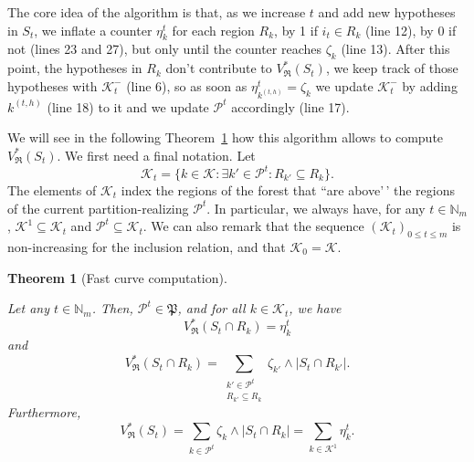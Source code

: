 \documentclass[
  11pt,
  a4paper,
]{article}
\theoremstyle{plain}
\theoremstyle{plain}
\theoremstyle{plain}
\newtheorem{theorem}{Theorem}[section]
\theoremstyle{definition}
\theoremstyle{definition}
\theoremstyle{remark}
\begin{document}
The core idea of the algorithm is that, as we increase \(t\) and add new
hypotheses in \(S_t\), we inflate a counter \(\eta_k^t\) for each region
\(R_k\), by 1 if \(i_t\in R_k\) (line 12), by 0 if not (lines 23 and
27), but only until the counter reaches \(\zeta_k\) (line 13). After
this point, the hypotheses in \(R_k\) don't contribute to
\(V^*_{\mathfrak{R}}(S_t)\), we keep track of those hypotheses with
\(\mathcal{K}^-_t\) (line 6), so as soon as
\(\eta^t_{k^{(t,h)}}=\zeta_k\) we update \(\mathcal{K}^-_t\) by adding
\(k^{(t,h)}\) (line 18) to it and we update \(\mathcal{P}^t\)
accordingly (line 17).

We will see in the following Theorem~\ref{thm-curve-path} how this
algorithm allows to compute \(V^*_{\mathfrak{R}}(S_t)\). We first need a
final notation. Let \begin{equation*}
\mathcal{K}_t=\{k\in\mathcal{K}: \exists k'\in \mathcal{P}^t : R_{k'}\subseteq R_k   \}.
\end{equation*} The elements of \(\mathcal{K}_t\) index the regions of
the forest that ``are above'\,' the regions of the current
partition-realizing \(\mathcal{P}^t\). In particular, we always have,
for any \(t\in\mathbb{N}_m\), \(\mathcal{K}^1\subseteq\mathcal{K}_t\)
and \(\mathcal{P}^t\subseteq \mathcal{K}_t\). We can also remark that
the sequence \((\mathcal{K}_t)_{0\leq t \leq m}\) is non-increasing for
the inclusion relation, and that \(\mathcal{K}_0=\mathcal{K}\).

\begin{theorem}[Fast curve
computation]\protect\hypertarget{thm-curve-path}{}\label{thm-curve-path}

Let any \(t\in\mathbb{N}_m\). Then, \(\mathcal{P}^t\in\mathfrak P\), and
for all \(k\in\mathcal{K}_t\), we have \begin{equation}
V^*_{\mathfrak{R}}(S_t\cap R_k) = \eta_k^t
\label{eq_vstar_inter_Rk_equal_eta}
\end{equation} and \begin{equation}
V^*_{\mathfrak{R}}(S_t\cap R_k) = \sum_{\substack{k'\in \mathcal{P}^t\\ R_{k'}\subseteq R_k}} \zeta_{k'}\wedge|S_t \cap R_{k'}|.
\label{eq_Pt_good_partition}
\end{equation} Furthermore, \begin{equation}
V^*_{\mathfrak{R}}(S_t)  = \sum_{{k\in \mathcal{P}^t}} \zeta_{k}\wedge|S_t \cap R_{k}|= \sum_{k\in\mathcal{K}^1} \eta_k^t.
\label{eq_vstar_equal_sum_eta}
\end{equation}

\end{theorem}
\end{document}
